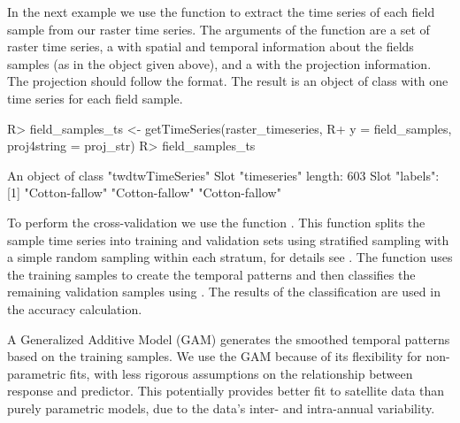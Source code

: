 \documentclass[article,shortnames]{jss}
\begin{document}
In the next example we use the function  to extract
the time series of each field sample from our raster time series. The
arguments of the function are a set of raster time series, a
 with spatial and temporal information about the fields
samples (as in the object  given above), and a
 with the projection information. The projection
should follow the  format. The result is an object of
class  with one time series for each field sample.

\begin{CodeChunk}

\begin{CodeInput}
R> field_samples_ts <- getTimeSeries(raster_timeseries, 
R+   y = field_samples, proj4string = proj_str)
R> field_samples_ts
\end{CodeInput}

\begin{CodeOutput}
An object of class "twdtwTimeSeries"
Slot "timeseries" length: 603 
Slot "labels": [1] "Cotton-fallow" "Cotton-fallow" "Cotton-fallow"
\end{CodeOutput}
\end{CodeChunk}

To perform the cross-validation we use the function
. This function splits the sample time series
into training and validation sets using stratified sampling with a
simple random sampling within each stratum, for details see
. The function uses the training
samples to create the temporal patterns and then classifies the
remaining validation samples using . The results of the
classification are used in the accuracy calculation.

A Generalized Additive Model (GAM)
\citep[\citet{Wood:2011}]{Hastie:1986} generates the smoothed temporal
patterns based on the training samples. We use the GAM because of its
flexibility for non-parametric fits, with less rigorous assumptions on
the relationship between response and predictor. This potentially
provides better fit to satellite data than purely parametric models, due
to the data's inter- and intra-annual variability.
\end{document}
